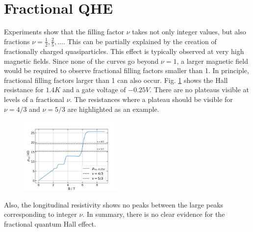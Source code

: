\section{Fractional QHE}

Experiments show that the filling factor $\nu$ takes not only integer values, but also fractions $\nu=\frac{1}{2}, \frac{2}{5}, ...$.
This can be partially explained by the creation of fractionally charged quasiparticles.
This effect is typically observed at very high magnetic fields.
Since none of the curves go beyond $\nu = 1$, a larger magnetic field would be required to observe fractional filling factors smaller than 1. In principle, fractional filling factors larger than 1 can also occur.
Fig. \ref{fig:FQHE} shows the Hall resistance for $1.4K$ and a gate voltage of $-0.25V$.
There are no plateaus visible at levels of a fractional $\nu$.
The resistances where a plateau should be visible for $\nu = 4/3$ and $\nu = 5/3$ are highlighted as an example.
\begin{figure}[h]
    \centering
    \includegraphics[width=0.45\textwidth]{../Images/FQHE.png}
    \caption{
        }
    \label{fig:FQHE}
\end{figure}
Also, the longitudinal resistivity shows no peaks between the large peaks corresponding to integer $\nu$.
In summary, there is no clear evidence for the fractional quantum Hall effect.







